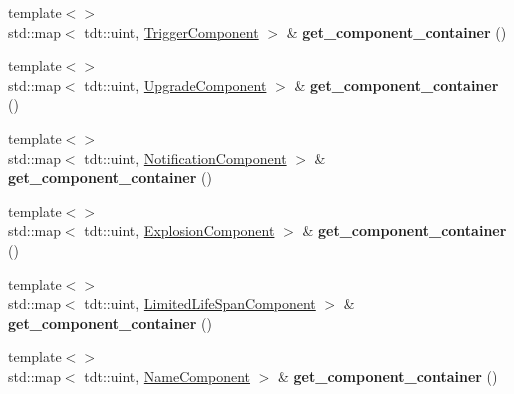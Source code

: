 \begin{DoxyCompactItemize}
\item 
{\footnotesize template$<$$>$ }\\std\+::map$<$ tdt\+::uint, \hyperlink{struct_trigger_component}{Trigger\+Component} $>$ \& {\bfseries get\+\_\+component\+\_\+container} ()\hypertarget{class_entity_system_a1e739ee1344c165ad6c4fc367012fcb7}{}\label{class_entity_system_a1e739ee1344c165ad6c4fc367012fcb7}

\item 
{\footnotesize template$<$$>$ }\\std\+::map$<$ tdt\+::uint, \hyperlink{struct_upgrade_component}{Upgrade\+Component} $>$ \& {\bfseries get\+\_\+component\+\_\+container} ()\hypertarget{class_entity_system_ae6cb26520283845d6252246a1036bf11}{}\label{class_entity_system_ae6cb26520283845d6252246a1036bf11}

\item 
{\footnotesize template$<$$>$ }\\std\+::map$<$ tdt\+::uint, \hyperlink{struct_notification_component}{Notification\+Component} $>$ \& {\bfseries get\+\_\+component\+\_\+container} ()\hypertarget{class_entity_system_ad5b9130b15cd48cfde11e53ee7eb707f}{}\label{class_entity_system_ad5b9130b15cd48cfde11e53ee7eb707f}

\item 
{\footnotesize template$<$$>$ }\\std\+::map$<$ tdt\+::uint, \hyperlink{struct_explosion_component}{Explosion\+Component} $>$ \& {\bfseries get\+\_\+component\+\_\+container} ()\hypertarget{class_entity_system_afac3210cc029aaf03ae43ebc1231fbd9}{}\label{class_entity_system_afac3210cc029aaf03ae43ebc1231fbd9}

\item 
{\footnotesize template$<$$>$ }\\std\+::map$<$ tdt\+::uint, \hyperlink{struct_limited_life_span_component}{Limited\+Life\+Span\+Component} $>$ \& {\bfseries get\+\_\+component\+\_\+container} ()\hypertarget{class_entity_system_a3ed3367fad2ed4db1e756d6db9d1aa71}{}\label{class_entity_system_a3ed3367fad2ed4db1e756d6db9d1aa71}

\item 
{\footnotesize template$<$$>$ }\\std\+::map$<$ tdt\+::uint, \hyperlink{struct_name_component}{Name\+Component} $>$ \& {\bfseries get\+\_\+component\+\_\+container} ()\hypertarget{class_entity_system_a7bc07dda74ab1a10fbde39e0f7536c74}{}\label{class_entity_system_a7bc07dda74ab1a10fbde39e0f7536c74}


\end{DoxyCompactItemize}

